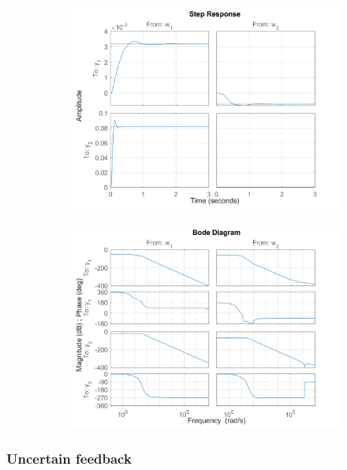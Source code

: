 \documentclass{article}
\begin{document}
\begin{figure}[H]
    \centering
    \begin{subfigure}{0.45\textwidth}
        \centering
        \includegraphics[width=\textwidth]{figures/K_g_step.png}
        \caption{}
    \end{subfigure}    
    \begin{subfigure}{0.45\textwidth}
        \centering
        \includegraphics[width=\textwidth]{figures/K_g_bode.png}
        \caption{}
    \end{subfigure}
\end{figure}

\subsubsection{Uncertain feedback}
\end{document}
